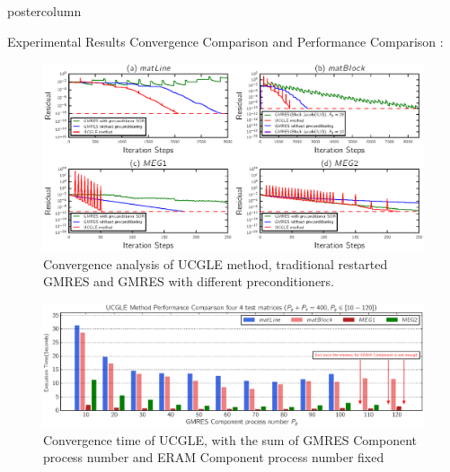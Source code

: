 \documentclass{beamer}
\begin{document}
\begin{frame}
\begin{columns}
\begin{column}{.33\textwidth}
\begin{beamercolorbox}[center]{postercolumn}
\begin{minipage}{.98\textwidth}
{					\begin{myblock}{Experimental Results}
					Convergence Comparison and Performance Comparison \cite{xwu2017}:
						\begin{figure}
							\begin{minipage}{0.84\textwidth}
								\centering\includegraphics[width=1\textwidth, height=0.2\textheight]{img/convergence.eps}
								\caption{Convergence analysis of UCGLE method, traditional restarted GMRES and GMRES with different preconditioners.}
							\end{minipage}
						\end{figure}
						\begin{figure}
							\begin{minipage}{0.82\textwidth}
								\centering\includegraphics[width=1\textwidth,height=0.1\textheight]{img/performance_time.eps}
								\caption{Convergence time of UCGLE, with the sum of GMRES Component process number and ERAM Component process number fixed}
							\end{minipage}
						\end{figure}

					\end{myblock}

}
\end{minipage}
\end{beamercolorbox}
\end{column}
\end{columns}
\end{frame}
\end{document}
